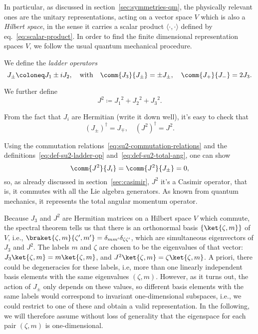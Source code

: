 In particular, as discussed in section~\ref{sec:symmetries-qm}, the physically relevant ones are the unitary representations, acting on a vector space $V$ which is also a \emph{Hilbert space}, in the sense it carries a scalar product $\langle \cdot, \cdot \rangle$ defined by eq.~\eqref{eq:scalar-product}. In order to find the finite dimensional representation spaces $V$, we follow the usual quantum mechanical procedure.

We define the \emph{ladder operators}
\begin{equation}\label{eq:def-su2-ladder-op}
    J_\pm \coloneq J_1 \pm i J_2, \quad \textup{with} \quad \comm{J_3}{J_\pm} = \pm J_\pm, \quad \comm{J_+}{J_-} = 2 J_3 .
\end{equation}

We further define
\begin{equation}\label{eq:def-su2-total-ang}
    J^2 \coloneq {J_1}^2 + {J_2}^2 + {J_3}^2.
\end{equation}

From the fact that $J_i$ are Hermitian (\color{red}write it down well\color{black}), it's easy to check that
\begin{equation}
    (J_\pm)^\dagger = J_\mp, \quad (J^2)^\dagger = J^2 .
\end{equation}

Using the commutation relations~\eqref{eq:su2-commutation-relations} and the definitions~\eqref{eq:def-su2-ladder-op} and~\eqref{eq:def-su2-total-ang}, one can show
\begin{equation}
    \comm{J^2}{J_i} = \comm{J^2}{J_\pm} = 0,
\end{equation}
so, as already discussed in section~\eqref{sec:casimir}, $J^2$ it's a Casimir operator, that is, it commutes with all the Lie algebra generators. As known from quantum mechanics, it represents the total angular momentum operator.

Because $J_3$ and $J^2$ are Hermitian matrices on a Hilbert space $V$ which commute, the spectral theorem tells us that there is an orthonormal basis $\{ \ket{\zeta, m} \}$ of $V$, i.e., $\braket{\zeta, m}{\zeta',m'} = \delta_{mm'} \delta_{\zeta\zeta'}$, which are simultaneous eigenvectors of $J_3$ and $J^2$. The labels $m$ and $\zeta$ are chosen to be the eigenvalues of that vector: $J_3 \ket{\zeta, m} = m \ket{\zeta, m}$, and $J^2 \ket{\zeta, m} = \zeta \ket{\zeta, m}$. A priori, there could be degeneracies for these labels, i.e, more than one linearly independent basis elements with the same eigenvalues $(\zeta,m)$. However, as it turns out, the action of $J_\pm$ only depends on these values, so different basis elements with the same labels would correspond to invariant one-dimensional subspaces, i.e., we could restrict to one of these and obtain a valid representation. In the following, we will therefore assume without loss of generality that the eigenspace for each pair $(\zeta,m)$ is one-dimensional.

